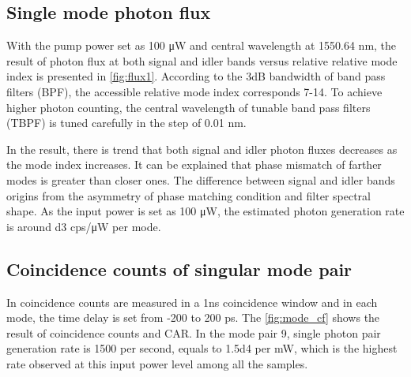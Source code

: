 \begin{figure}
	\centering
	
	\label{fig:ligentec_gp1}
\end{figure}

\subsection{Single mode photon flux}

With the pump power set as 100 \si{\micro\watt} and central wavelength at 1550.64 nm, the result of photon flux at both signal and idler bands versus relative relative mode index is presented in \autoref{fig:flux1}. According to the 3dB bandwidth of band pass filters (BPF), the accessible relative mode index corresponds 7-14. To achieve higher photon counting, the central wavelength of tunable band pass filters (TBPF) is tuned carefully in the step of 0.01 nm.

In the result, there is trend that both signal and idler photon fluxes decreases as the mode index increases. It can be explained that phase mismatch of farther modes is greater than closer ones. The difference between signal and idler bands origins from the asymmetry of phase matching condition and filter spectral shape. As the input power is set as 100 \si{\micro\watt}, the estimated photon generation rate is around \num{d3} cps/\si{\micro\watt} per mode.

\begin{figure}
	\centering
	
	\label{fig:flux1}
\end{figure}


\subsection{Coincidence counts of singular mode pair}

In coincidence counts are measured in a 1ns coincidence window and in each mode, the time delay is set from -200 to 200 ps. The \autoref{fig:mode_cf} shows the result of coincidence counts and CAR. In the mode pair 9, single photon pair generation rate is 1500 per second, equals to \num{1.5d4} per mW, which is the highest rate observed at this input power level among all the samples.

